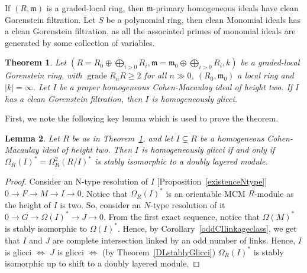 \documentclass[11pt,letterpaper]{amsart}
\newcommand{\x}{\xrightarrow{}}
\DeclareMathOperator{\gr}{grade}
\theoremstyle{plain}
\newtheorem{thm}{Theorem}[section]
\newtheorem{lem}[thm]{Lemma}
\theoremstyle{definition}
\theoremstyle{remark}
\begin{document}
If $(R,\mathfrak m)$ is a graded-local ring, then $\mathfrak m$-primary homogeneous ideals have clean Gorenstein filtration. Let $S$ be a polynomial ring, then clean Monomial ideals has a clean Gorenstein filtration, as all the associated primes of monomial ideals are generated by some collection of variables.

\begin{thm}\label{cleanGorensteinfiltrations}
    Let $(R=R_0\oplus\bigoplus_{i>0}R_i,\mathfrak m=\mathfrak m_0\oplus\bigoplus_{i>0} R_i,k)$ be a graded-local Gorenstein ring, with $\gr R_nR\ge 2$ for all $n\gg 0$, $(R_0,\mathfrak m_0)$ a local ring and $|k|=\infty$. Let $I$ be a proper homogeneous Cohen-Macaulay ideal of height two. If $I$ has a clean Gorenstein filtration, then $I$ is homogeneously glicci.   
\end{thm}

First, we note the following key lemma which is used to prove the theorem. 

\begin{lem}\label{IglicciiffOmega(I)^*}
    Let $R$ be as in Theorem~\ref{cleanGorensteinfiltrations}, and let $I\subsetneq R$ be a homogeneous Cohen-Macaulay ideal of height two. Then $I$ is homogeneously glicci if and only if $\Omega_R(I)^*=\Omega^2_R(R/I)^*$ is stably isomorphic to a doubly layered module.  
\end{lem}

\begin{proof}
    Consider an N-type resolution of $I$ [Proposition~\ref{existenceNtype}] $0\x F\x M\x I\x 0$. Notice that $\Omega_R(I)^*$ is an orientable MCM $R$-module as the height of $I$ is two. So, consider an $N$-type resolution of it  $0\x G\x\Omega(I)^*\x J\x 0$. From the first exact sequence, notice that $\Omega(M)^*$ is stably isomorphic to $\Omega(I)^*$. Hence, by Corollary~\ref{oddCIlinkageclass}, we get that $I$ and $J$ are complete intersection linked by an odd number of links. Hence, $I$ is glicci $\iff$ $J$ is glicci $\iff$ (by Theorem~\ref{DLstablyGlicci}) $\Omega_R(I)^*$ is stably isomorphic up to shift to a doubly layered module. 
\end{proof}
\end{document}
